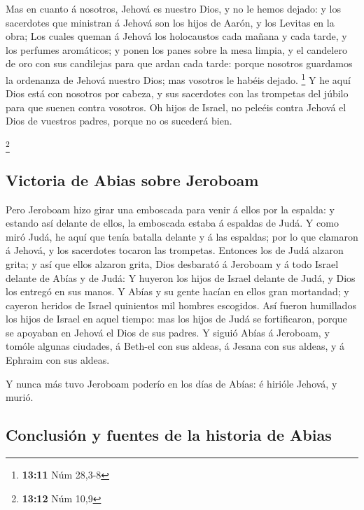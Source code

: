  Mas en cuanto á nosotros, Jehová es nuestro Dios, y no
le hemos dejado: y los sacerdotes que ministran á Jehová son los hijos
de Aarón, y los Levitas en la obra;  Los cuales queman á
Jehová los holocaustos cada mañana y cada tarde, y los perfumes
aromáticos; y ponen los panes sobre la mesa limpia, y el candelero de
oro con sus candilejas para que ardan cada tarde: porque nosotros
guardamos la ordenanza de Jehová nuestro Dios; mas vosotros le habéis
dejado. \footnote{\textbf{13:11} Núm 28,3-8}  Y he aquí
Dios está con nosotros por cabeza, y sus sacerdotes con las trompetas
del júbilo para que suenen contra vosotros. Oh hijos de Israel, no
peleéis contra Jehová el Dios de vuestros padres, porque no os sucederá
bien.

\footnote{\textbf{13:12} Núm 10,9}

\hypertarget{victoria-de-abias-sobre-jeroboam}{%
\subsection{Victoria de Abias sobre
Jeroboam}\label{victoria-de-abias-sobre-jeroboam}}

 Pero Jeroboam hizo girar una emboscada para venir á
ellos por la espalda: y estando así delante de ellos, la emboscada
estaba á espaldas de Judá.  Y como miró Judá, he aquí que
tenía batalla delante y á las espaldas; por lo que clamaron á Jehová, y
los sacerdotes tocaron las trompetas.  Entonces los de
Judá alzaron grita; y así que ellos alzaron grita, Dios desbarató á
Jeroboam y á todo Israel delante de Abías y de Judá:  Y
huyeron los hijos de Israel delante de Judá, y Dios los entregó en sus
manos.  Y Abías y su gente hacían en ellos gran
mortandad; y cayeron heridos de Israel quinientos mil hombres escogidos.
 Así fueron humillados los hijos de Israel en aquel
tiempo: mas los hijos de Judá se fortificaron, porque se apoyaban en
Jehová el Dios de sus padres.  Y siguió Abías á Jeroboam,
y tomóle algunas ciudades, á Beth-el con sus aldeas, á Jesana con sus
aldeas, y á Ephraim con sus aldeas.

 Y nunca más tuvo Jeroboam poderío en los días de Abías:
é hirióle Jehová, y murió.

\hypertarget{conclusiuxf3n-y-fuentes-de-la-historia-de-abias}{%
\subsection{Conclusión y fuentes de la historia de
Abias}\label{conclusiuxf3n-y-fuentes-de-la-historia-de-abias}}

